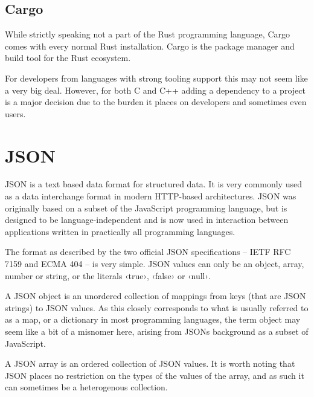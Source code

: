 
\subsection{Cargo}

While strictly speaking not a part of the Rust programming language, Cargo comes with every normal Rust installation. Cargo is the package manager and build tool for the Rust ecosystem.

For developers from languages with strong tooling support this may not seem like a very big deal. However, for both C and C++ adding a dependency to a project is a major decision due to the burden it places on developers and sometimes even users.



\section{JSON}
\label{sec:json}

JSON is a text based data format for structured data. It is very commonly used as a data interchange format in modern HTTP-based architectures. JSON was originally based on a subset of the JavaScript programming language, but is designed to be language-independent and is now used in interaction between applications written in practically all programming languages.

The format as described by the two official JSON specifications -- IETF RFC 7159\cite{RFC7159} and ECMA 404\cite{ECMA404} -- is very simple. JSON values can only be an object, array, number or string, or the literals ‹true›, ‹false› or ‹null›.

A JSON object is an unordered collection of mappings from keys (that are JSON strings) to JSON values. As this closely corresponds to what is usually referred to as a map, or a dictionary in most programming languages, the term object may seem like a bit of a misnomer here, arising from JSONs background as a subset of JavaScript.

A JSON array is an ordered collection of JSON values. It is worth noting that JSON places no restriction on the types of the values of the array, and as such it can sometimes be a heterogenous collection.

